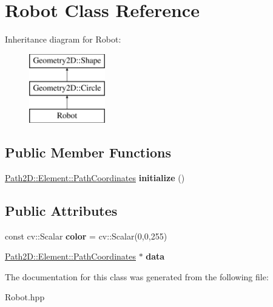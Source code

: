 \hypertarget{class_robot}{}\section{Robot Class Reference}
\label{class_robot}
Inheritance diagram for Robot\+:\begin{figure}[H]
\begin{center}
\leavevmode
\includegraphics[height=3.000000cm]{class_robot}
\end{center}
\end{figure}
\subsection*{Public Member Functions}
\begin{DoxyCompactItemize}
\item 
\mbox{\label{class_robot_a1a6ea7ba58f7a57aa2f32f59b01fb80d}} 
\mbox{\hyperlink{class_path2_d_1_1_element_1_1_path_coordinates}{Path2\+D\+::\+Element\+::\+Path\+Coordinates}} {\bfseries initialize} ()
\end{DoxyCompactItemize}
\subsection*{Public Attributes}
\begin{DoxyCompactItemize}
\item 
\mbox{\label{class_robot_a8f89b1b5df8f5e247e608787923fe06c}} 
const cv\+::\+Scalar {\bfseries color} = cv\+::\+Scalar(0,0,255)
\item 
\mbox{\label{class_robot_ac7ca04ea707b612e24dc36ab3bcfad7e}} 
\mbox{\hyperlink{class_path2_d_1_1_element_1_1_path_coordinates}{Path2\+D\+::\+Element\+::\+Path\+Coordinates}} $\ast$ {\bfseries data}
\end{DoxyCompactItemize}


The documentation for this class was generated from the following file\+:\begin{DoxyCompactItemize}
\item 
Robot.\+hpp\end{DoxyCompactItemize}
